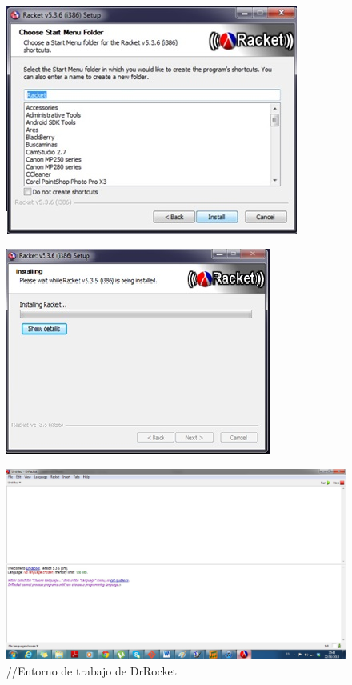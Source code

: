 \documentclass[11pt]{article} %
\begin{document}
\begin{figure}[h]
\centering
    \includegraphics{imagenes_investigacion/paso_tres.jpg}
\caption { }
\label{Figura 3}
\end{figure}

\begin{figure}[h]
\centering
    \includegraphics{imagenes_investigacion/paso_cuatro.jpg}
\caption { }
\label{Figura 4}
\end{figure}


\begin{figure}[h]
\centering
    \includegraphics[width=450pts] {imagenes_investigacion/entorno.jpg}
\caption {//Entorno de trabajo de DrRocket}
\label{Figura 5}
\end{figure}
\end{document}
